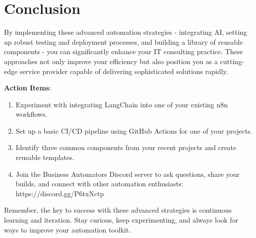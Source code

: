 \section{Conclusion}

By implementing these advanced automation strategies - integrating AI, setting up robust testing and deployment processes, and building a library of reusable components - you can significantly enhance your IT consulting practice. These approaches not only improve your efficiency but also position you as a cutting-edge service provider capable of delivering sophisticated solutions rapidly.

\textbf{Action Items}:
\begin{enumerate}
    \item Experiment with integrating LangChain into one of your existing n8n workflows.
    \item Set up a basic CI/CD pipeline using GitHub Actions for one of your projects.
    \item Identify three common components from your recent projects and create reusable templates.
    \item Join the Business Automators Discord server to ask questions, share your builds, and connect with other automation enthusiasts: \newline https://discord.gg/P6txNctp
\end{enumerate}

Remember, the key to success with these advanced strategies is continuous learning and iteration. Stay curious, keep experimenting, and always look for ways to improve your automation toolkit.


